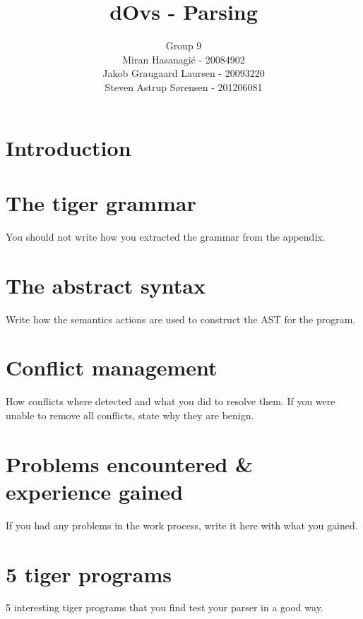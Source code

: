 \documentclass{article}
\title{dOvs - Parsing}
\author{
  Group 9 \\
  Miran Hasanagi\'{c} - 20084902 \\
  Jakob Graugaard Laursen - 20093220\\
  Steven Astrup S\o rensen - 201206081
}
\begin{document}
\maketitle

\section{Introduction}

\section{The tiger grammar}
You should not write how you extracted the grammar from the appendix.

\section{The abstract syntax}
Write how the semantics actions are used to construct the AST for the program.

\section{Conflict management}
How conflicts where detected and what you did to resolve them. If you were unable to remove all conflicts, state why they are benign.

\section{Problems encountered \& experience gained}
If you had any problems in the work process, write it here with what you gained.

\section{5 tiger programs}
5 interesting tiger programs that you find test your parser in a good way.
\end{document}
